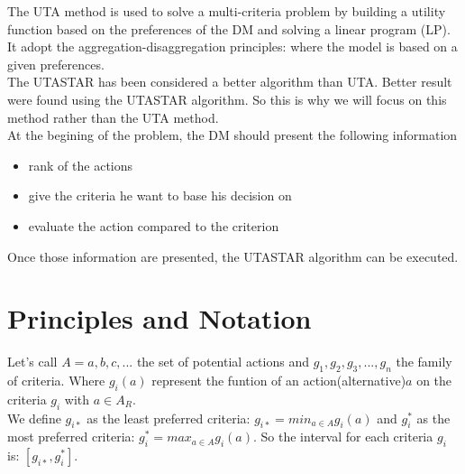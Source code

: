 \documentclass{report}
\begin{document}
The UTA method is used to solve a multi-criteria problem by building a utility function based on the preferences of the DM and solving a linear program (LP). It adopt the aggregation-disaggregation principles: where the model is based on a given preferences.\\

The UTASTAR has been considered a better algorithm than UTA. Better result were found using the UTASTAR algorithm. So this is why we will focus on this method rather than the UTA method.\\

At the begining of the problem, the DM should present the following information 
\begin{itemize}
\item rank of the actions
\item give the criteria he want to base his decision on 
\item evaluate the action compared to the criterion
\end{itemize}
Once those information are presented, the UTASTAR algorithm can be executed. 

\newpage
\section{Principles and Notation}
Let's call $A={a,b,c,...}$ the set of potential actions and $g_1, g_2, g_3, ..., g_n$ the family of criteria. Where $g_i(a)$ represent the funtion of an action(alternative)$a$ on the criteria $g_i$ with $a \in A_R$. \\

We define $g_{i*}$ as the least preferred criteria: $g_{i*} = min_{a \in A} g_i (a)$ and $g_i^{*}$ as the most preferred criteria: $g_i^{*} = max_{a \in A} g_i (a)$. So the interval for each criteria $g_i$ is: $[g_{i*} , g_i^{*}]$.\\
\end{document}
